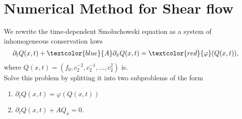 \section{Numerical Method for Shear flow}
\begin{frame}
	\scriptsize
	We rewrite the time-dependent Smoluchowski equation as a system of inhomogeneous conservation laws
	\begin{align}
		\partial_t Q(x,t) + \textcolor{blue}{A}\partial_x Q(x,t) = \textcolor{red}{\varphi} (Q(x,t)),
	\end{align}
	where $Q(x,t) = (f_0, c^{-2}_2, c^{-1}_2, ..., c^2_2)$ is. \\
	\vspace{0.5cm}
	Solve this problem by splitting it into two subproblems of the form
	\begin{enumerate}
		\item $\partial_t Q(x,t)  = \varphi (Q(x,t))$
		\item $\partial_t Q(x,t) + A Q_x=0$.
	\end{enumerate}
\end{frame}